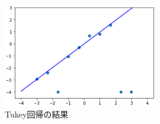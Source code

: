 \documentclass[fleqn]{jsarticle}
\begin{document}
\begin{figure}[h]
  \begin{center}
    \includegraphics[width=0.6\textwidth]{figs/TukeyRegression.eps}
  \end{center}
  \caption{Tukey回帰の結果}
\end{figure}
\end{document}
